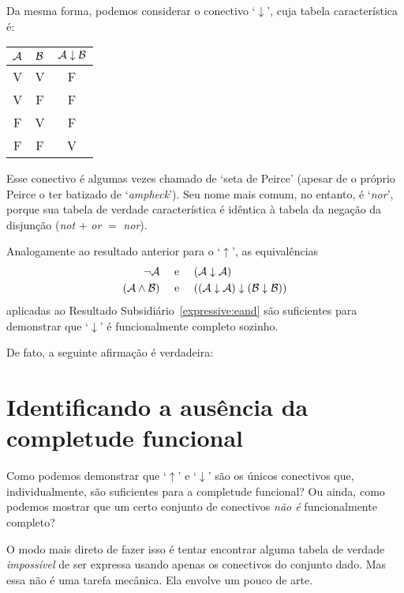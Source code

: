 Da mesma forma, podemos considerar o conectivo `$\downarrow$', cuja tabela característica é:
\begin{center}
\begin{tabular}{c c | c}
$\mathcal{A}$ & $\mathcal{B}$ & $\mathcal{A} \mathrel{\downarrow} \mathcal{B}$\\
\hline
 V & V & F \\
 V & F & F  \\
 F & V & F  \\
 F & F & V
\end{tabular}
\end{center}
Esse conectivo é algumas vezes chamado de `seta de Peirce' (apesar de o próprio Peirce o ter batizado de `\emph{ampheck}').
Seu nome mais comum, no entanto, é `\emph{nor}', porque sua tabela de verdade característica é idêntica à tabela  da negação da disjunção (\emph{not} $+$ \emph{or} $=$ \emph{nor}).

Analogamente ao resultado anterior para o `$\uparrow$', as equivalências
		\begin{align*}
			\neg \mathcal{A} &\text{\quad \ e \quad} (\mathcal{A} \downarrow \mathcal{A})\\
			(\mathcal{A} \wedge \mathcal{B}) & \text{\quad \ e \quad} ((\mathcal{A} \downarrow \mathcal{A}) \downarrow (\mathcal{B} \downarrow \mathcal{B}))
		\end{align*}
aplicadas ao Resultado Subsidiário~\ref{expressive:eand} são suficientes para demonstrar que `$\downarrow$' é funcionalmente completo sozinho.

De fato, a seguinte afirmação é verdadeira:        
        

\section{Identificando a ausência da completude funcional}

Como podemos demonstrar que `$\uparrow$' e `$\downarrow$' são os únicos conectivos que, individualmente, são suficientes para a completude funcional? Ou ainda, como podemos mostrar que um certo conjunto de conectivos \emph{não é} funcionalmente completo?

O modo mais direto de fazer isso é tentar encontrar alguma tabela de verdade \emph{impossível} de ser expressa usando apenas os conectivos do conjunto dado.
Mas essa não é uma tarefa mecânica.
Ela envolve um pouco de arte.

